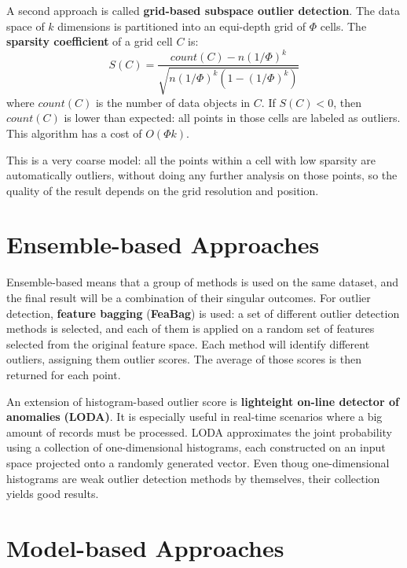 A second approach is called \textbf{grid-based subspace outlier detection}. The data space of $k$ dimensions is partitioned into an equi-depth grid of $\Phi$ cells. The \textbf{sparsity coefficient} of a grid cell $C$ is:
\begin{equation*}
    S(C) = \dfrac{\textit{count}(C) - n (1/ \Phi)^k}{\sqrt{n(1/\Phi)^k (1-(1/\Phi)^k)}}
\end{equation*}
where $\textit{count}(C)$ is the number of data objects in $C$. If $S(C) < 0$, then $\textit{count}(C)$ is lower than expected: all points in those cells are labeled as outliers. This algorithm has a cost of $O(\Phi k)$.

This is a very coarse model: all the points within a cell with low sparsity are automatically outliers, without doing any further analysis on those points, so the quality of the result depends on the grid resolution and position. 

\section{Ensemble-based Approaches}

Ensemble-based means that a group of methods is used on the same dataset, and the final result will be a combination of their singular outcomes. For outlier detection, \textbf{feature bagging} (\textbf{FeaBag}) is used: a set of different outlier detection methods is selected, and each of them is applied on a random set of features selected from the original feature space. Each method will identify different outliers, assigning them outlier scores. The average of those scores is then returned for each point.

An extension of histogram-based outlier score is \textbf{lighteight on-line detector of anomalies} \textbf{(LODA)}. It is especially useful in real-time scenarios where a big amount of records must be processed. LODA approximates the joint probability using a collection of one-dimensional histograms, each constructed on an input space projected onto a randomly generated vector. Even thoug one-dimensional histograms are weak outlier detection methods by themselves, their collection yields good results.

\section{Model-based Approaches}

